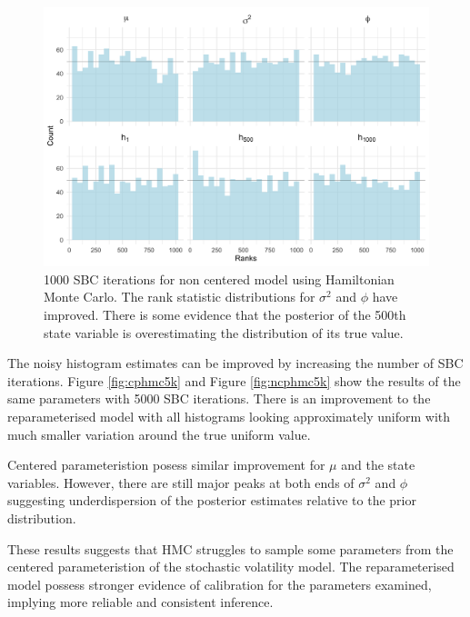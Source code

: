 \documentclass[12pt, a4paper]{article}
\begin{document}
    \begin{figure}[H]
        \centering
        \includegraphics[scale=0.09]{results/hmc_ncp_1k.png}
        \caption{1000 SBC iterations for non centered model using Hamiltonian Monte Carlo. The rank statistic distributions for $\sigma^2$ and $\phi$ have improved. There is some evidence that the posterior of the 500th state variable is overestimating the distribution of its true value.}
        \label{fig:ncphmc1k}
    \end{figure}

    The noisy histogram estimates can be improved by increasing the number of SBC iterations. Figure \ref{fig:cphmc5k} and Figure \ref{fig:ncphmc5k} show the results of the same parameters with 5000 SBC iterations. There is an improvement to the reparameterised model with all histograms looking approximately uniform with much smaller variation around the true uniform value. 
    
    Centered parameteristion posess similar improvement for $\mu$ and the state variables. However, there are still major peaks at both ends of $\sigma^2$ and $\phi$ suggesting underdispersion of the posterior estimates relative to the prior distribution.

    These results suggests that HMC struggles to sample some parameters from the centered parameteristion of the stochastic volatility model. The reparameterised model possess stronger evidence of calibration for the parameters examined, implying more reliable and consistent inference.
\end{document}
